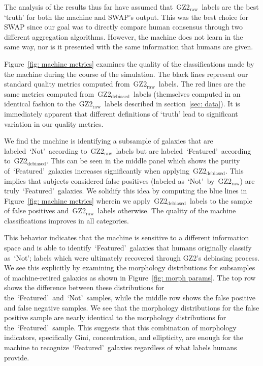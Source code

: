 \documentclass[twocolumn]{aastex6}
\newcommand{\feat}{`Featured'}
\newcommand{\notfeat}{`Not'}
\newcommand{\raw}{GZ2$_{\text{raw}}$}
\newcommand{\deb}{GZ2$_{\text{debiased}}$}
\begin{document}
The analysis of the results thus far have assumed that~\raw~labels  are the 
best `truth' for both the machine and SWAP's output. 
This was the best choice for SWAP since our goal was to directly compare 
human consensus through two different aggregation algorithms.
However, the machine does not learn in the same way, nor is it presented with the 
same information that humans are given. 

Figure~\ref{fig: machine metrics} examines the quality of the classifications made by 
the machine during the course of the simulation. The black lines represent our 
standard quality metrics computed from~\raw~labels. The red lines are the same 
metrics computed from~\deb~labels (themselves computed in an identical fashion
to the~\raw~labels described in section~\ref{sec: data}). It is immediately apparent
that different definitions of `truth' lead to significant variation in our quality metrics. 

We find the machine is identifying a subsample of galaxies that are 
labeled~\notfeat~according to~\raw~labels but are labeled~\feat~according to~\deb.
 This can be seen in the middle panel which shows the purity of~\feat~galaxies 
increases significantly when applying~\deb. This implies that
subjects considered false positives (labeled as~\notfeat~by~\raw) are truly~\feat~galaxies. 
We solidify this idea by computing the blue lines in Figure~\ref{fig: machine metrics}
wherein we apply~\deb~labels to the sample of false positives and~\raw~labels otherwise. 
The quality of the machine classifications improves in all categories. 

This behavior indicates that the machine is sensitive to a different information space 
and is able to identify~\feat~galaxies that humans originally classify as~\notfeat; 
labels which were ultimately recovered through GZ2's debiasing process. 
We see this explicitly by examining the morphology distributions for subsamples of
 machine-retired galaxies as shown in Figure~\ref{fig: morph params}.
 The top row shows the difference between these distributions for 
the~\feat~and~\notfeat~samples, while the middle row shows the false positive 
and false negative samples. We see that the morphology distributions for the 
false positive sample are nearly identical to the morphology distributions for the~\feat~sample. 
This suggests that this combination of morphology indicators, specifically 
Gini, concentration, and ellipticity, are enough for the machine to recognize~\feat~galaxies 
regardless of what labels humans provide.  
\end{document}
